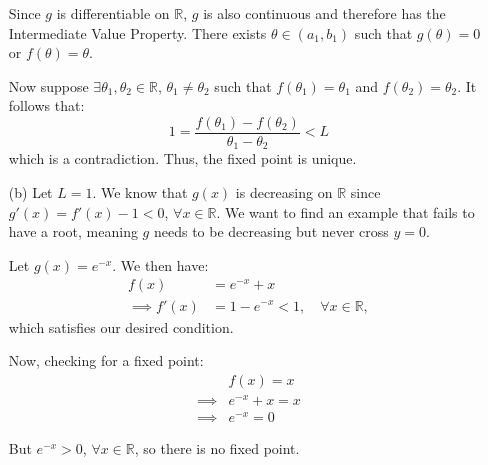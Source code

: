 \begin{solution}
\begin{itemize}
              Since $g$ is differentiable on $\mathbb{R}$, $g$ is also continuous and
              therefore has the Intermediate Value Property.
              There exists $\theta \in (a_1, b_1)$ such that $g(\theta) = 0$ or $f(\theta) = \theta$.

              Now suppose $\exists \theta_1, \theta_2 \in \mathbb{R}$, $\theta_1 \neq \theta_2$
              such that $f(\theta_1) = \theta_1$ and $f(\theta_2) = \theta_2$.
              It follows that:
              \[
                  1 = \frac{f(\theta_1) - f(\theta_2)}{\theta_1 - \theta_2} < L
              \]
              which is a contradiction. Thus, the fixed point is unique.
        \item[(b)]
              Let $L = 1$. We know that $g(x)$ is decreasing on $\mathbb{R}$ since
              $g'(x) = f'(x) - 1 < 0$, $\forall x \in \mathbb{R}$.
              We want to find an example that fails to have a root, meaning $g$ needs
              to be decreasing but never cross $y = 0$.

              Let $g(x) = e^{-x}$. We then have:
              \begin{align*}
                  f(x)           & = e^{-x} + x                                      \\
                  \implies f'(x) & = 1 - e^{-x} < 1, \quad \forall x \in \mathbb{R},
              \end{align*}
              which satisfies our desired condition.

              Now, checking for a fixed point:
              \begin{align*}
                           & f(x) = x       \\
                  \implies & e^{-x} + x = x \\
                  \implies & e^{-x} = 0
              \end{align*}

              But $e^{-x} > 0$, $\forall x \in \mathbb{R}$, so there is no fixed point.
    \end{itemize}
\end{solution}